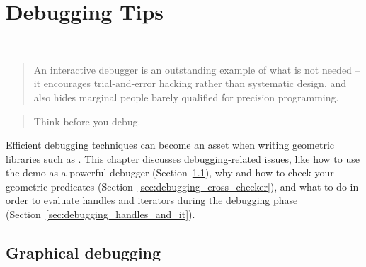 
\chapter{Debugging Tips}
\label{chap:debugging}
 \\


\begin{quote}
An interactive debugger is an outstanding example of what is not needed --
it encourages trial-and-error hacking rather than systematic design, and
also hides marginal people barely qualified for precision programming.

\hspace*{\fill}{\em Harlan Mills}
\end{quote}

\begin{quote}
Think before you debug.

\hspace*{\fill}{\em Anonymous \cgal\ Developer}
\end{quote}

Efficient debugging techniques can become an asset when writing geometric 
libraries such as \cgal. 
This chapter discusses debugging-related issues, like how to use 
the demo as a powerful debugger (Section~\ref{sec:graphical_debugging}), 
why and how to check your geometric predicates 
(Section~\ref{sec:debugging_cross_checker}), and what 
to do in order to evaluate handles and iterators during the debugging phase
(Section~\ref{sec:debugging_handles_and_it}).

\section{Graphical debugging} 
\label{sec:graphical_debugging}

